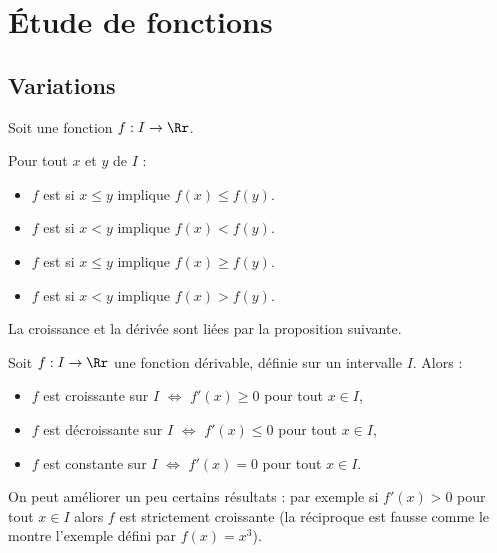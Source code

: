 \documentclass[11pt,class=report,crop=false]{standalone}
\begin{document}

\section{Étude de fonctions}

\subsection{Variations}

Soit une fonction $f : I \to \Rr$.
\begin{definition}
Pour tout $x$ et $y$ de $I$ : 
\begin{itemize}
  \item $f$ est  si $x\le y$ implique $f(x) \le f(y)$. 
  \item $f$ est  si $x < y$ implique $f(x) < f(y)$. 
  \item $f$ est  si $x\le y$ implique $f(x) \ge f(y)$. 
  \item $f$ est  si $x < y$ implique $f(x) > f(y)$.
\end{itemize}    
\end{definition}



La croissance et la dérivée sont liées par la proposition suivante.
\begin{proposition}
Soit $f : I \to \Rr$ une fonction dérivable, définie sur un intervalle $I$.
Alors :
\begin{itemize}
  \item $f$ est croissante sur $I$ $\iff$ $f'(x)\ge0$ pour tout $x \in I$,
  \item $f$ est décroissante  sur $I$ $\iff$ $f'(x)\le0$ pour tout $x \in I$,  
  \item $f$ est constante  sur $I$ $\iff$ $f'(x) = 0$ pour tout $x \in I$.
\end{itemize}
\end{proposition}

On peut améliorer un peu certains résultats : par exemple si $f'(x)>0$ pour tout $x\in I$ alors $f$ est strictement croissante (la réciproque est fausse comme le montre l'exemple défini par $f(x)=x^3$).
\end{document}
